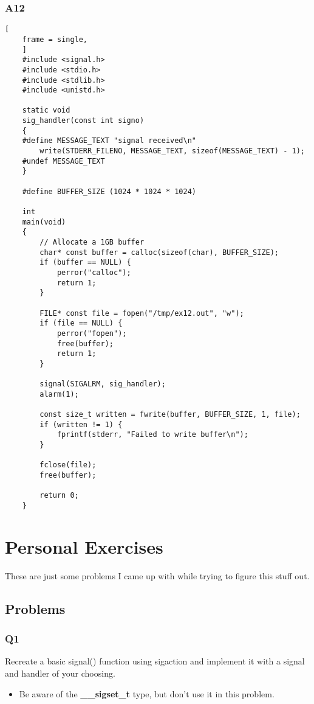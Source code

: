 \documentclass{article}
\begin{document}
\subsubsection{A12\label{a12}}
\begin{lstlisting}[
    frame = single,
    ]
    #include <signal.h>
    #include <stdio.h>
    #include <stdlib.h>
    #include <unistd.h>

    static void
    sig_handler(const int signo)
    {
    #define MESSAGE_TEXT "signal received\n"
        write(STDERR_FILENO, MESSAGE_TEXT, sizeof(MESSAGE_TEXT) - 1);
    #undef MESSAGE_TEXT
    }

    #define BUFFER_SIZE (1024 * 1024 * 1024)

    int
    main(void)
    {
        // Allocate a 1GB buffer
        char* const buffer = calloc(sizeof(char), BUFFER_SIZE);
        if (buffer == NULL) {
            perror("calloc");
            return 1;
        }

        FILE* const file = fopen("/tmp/ex12.out", "w");
        if (file == NULL) {
            perror("fopen");
            free(buffer);
            return 1;
        }

        signal(SIGALRM, sig_handler);
        alarm(1);

        const size_t written = fwrite(buffer, BUFFER_SIZE, 1, file);
        if (written != 1) {
            fprintf(stderr, "Failed to write buffer\n");
        }

        fclose(file);
        free(buffer);

        return 0;
    }
\end{lstlisting}
\section{Personal Exercises}
These are just some problems I came up with while trying to figure this stuff out.
\subsection{Problems}
\subsubsection{Q1}
Recreate a basic signal() function using sigaction and implement it with a 
signal and handler of your choosing.
\begin{itemize}
    \item Be aware of the \textbf{\_\_sigset\_t} type, but don't use it in this problem.
\end{itemize}
\end{document}
